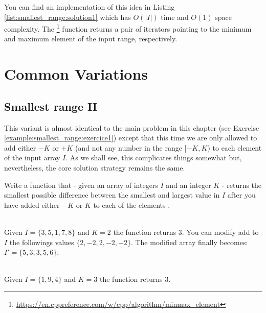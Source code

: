 You can find an implementation of this idea in Listing \ref{list:smallest_range:solution1} which has
$O(|I|)$ time and $O(1)$ space complexity. The
\footnote{\url{https://en.cppreference.com/w/cpp/algorithm/minmax_element}}
function  returns a pair of iterators pointing to the minimum and maximum element of the input
range, respectively.



\section{Common Variations}
\subsection{Smallest range \RN{2} } This variant is almost identical to the main problem in this
chapter (see Exercise \ref{example:smallest_range:exercice1}) except that this time we are only
allowed to add either $-K$ or $+K$ (and not any number in the range $[-K,K$) to each
element of the input array $I$. As we shall see, this complicates things somewhat but,
nevertheless, the core solution strategy remains the same. 

\begin{exercise}
	\label{example:smallest_range:variation1:exercice1}
	Write a function that  - given an array of integers $I$ and an integer $K$ -  returns the
	smallest possible difference between the smallest and largest value in $I$ after you have added either $-K$ or $K$
	to each of the elements .
	
		\begin{example}
			\label{example:smallest_range:variation1:example1}
			\hfill \\
			Given $I = \{3,5,1,7,8\}$ and $K=2$ the function returns $3$. You can modify add to
			$I$ the followings values $\{2,-2,2,-2,-2\}$. The modified array finally becomes:
			$I'=\{5,3,3,5,6\}$. 
		\end{example}
	
		\begin{example}
			\label{example:smallest_range:variation1:example2}
			\hfill \\
			Given $I = \{1,9,4\}$ and $K=3$ the function returns $3$.
		\end{example}
	
	\end{exercise}


